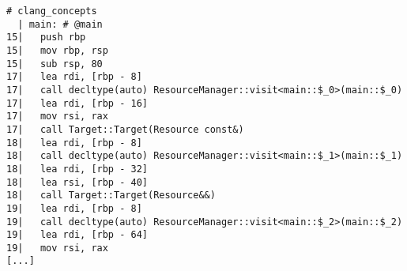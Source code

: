 \begin{lstlisting}[language={},numbers=none,title=\href{https://godbolt.org/z/VkN9fE}{\texttt{godbolt.org/z/VkN9fE}}]
# clang_concepts 
  | main: # @main
15|   push rbp
15|   mov rbp, rsp
15|   sub rsp, 80
17|   lea rdi, [rbp - 8]
17|   call decltype(auto) ResourceManager::visit<main::$_0>(main::$_0)
17|   lea rdi, [rbp - 16]
17|   mov rsi, rax
17|   call Target::Target(Resource const&)
18|   lea rdi, [rbp - 8]
18|   call decltype(auto) ResourceManager::visit<main::$_1>(main::$_1)
18|   lea rdi, [rbp - 32]
18|   lea rsi, [rbp - 40]
18|   call Target::Target(Resource&&)
19|   lea rdi, [rbp - 8]
19|   call decltype(auto) ResourceManager::visit<main::$_2>(main::$_2)
19|   lea rdi, [rbp - 64]
19|   mov rsi, rax
[...]
\end{lstlisting}
